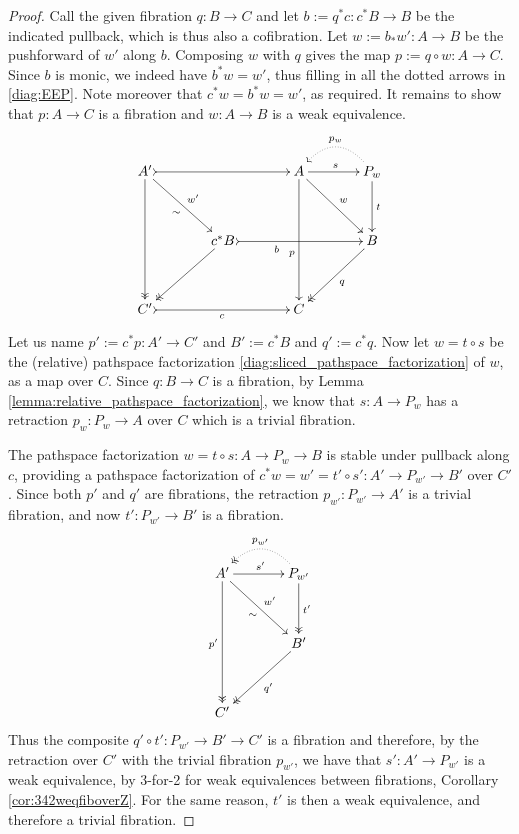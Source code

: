 \documentclass[11pt,reqno]{amsart}
\newcommand{\ra}{\ensuremath{\rightarrow}}
\theoremstyle{remark}
\theoremstyle{definition}
\begin{document}
\begin{proof}
Call the given fibration $q:B\ra C$ and let $b:=  q^*c : c^*B \ra B$ be the indicated pullback, which is thus also a cofibration. Let $w := b_*w' : A\ra B$ be the pushforward of $w'$ along $b$.  Composing $w$ with $q$ gives the map $p:= q\circ w:A\ra C$.  Since $b$ is monic, we indeed have $b^*w = w'$, thus filling in all the dotted arrows in \eqref{diag:EEP}.  Note moreover that $c^*w =  b^*w = w'$, as required. It remains to show that $p:A\ra C$ is a fibration and $w : A\ra B$ is a weak equivalence.   
\begin{equation}\label{diag:EEPfactored}
\xymatrix@=1.5em{
A' \ar@{->>}[dddd] \ar[rrdd]_{\sim}^{w'} \ar@{>->}[rrrr] && && A \ar[dddd]_>>>>>>>>>>>>p \ar[rrdd]^{w} \ar[rr]^s && \ar@{.>}@/_1.5pc/[ll]_{p_w} P_w \ar[dd]^t \\
\\
&& c^*B \ar@{->>}[lldd] \ar@{>->}[rrrr]_<<<<<<<<<<b  &&&& B \ar@{->>}[lldd]^q  \\
\\
C' \ar@{>->}[rrrr]_c &&&& C &&
}
\end{equation}
Let us name $p':= c^*p : A' \ra C'$ and $B' := c^*B$ and $q':= c^*q$.
Now let $w=t\circ s$ be the (relative) pathspace factorization \eqref{diag:sliced_pathspace_factorization} of $w$, as a map over $C$.  Since $q:B \ra C$ is a fibration, by Lemma \ref{lemma:relative_pathspace_factorization}, we know that $s : A\ra P_w$ has a retraction $p_w : P_w \ra A$ over $C$ which is a trivial fibration.  

The pathspace factorization $w=t\circ s : A \ra P_w \ra B$ is stable under pullback along $c$, providing a pathspace factorization of $c^*w = w'=t'\circ s' : A' \ra P_{w'} \ra B'$ over $C'$.  Since both $p'$ and $q'$ are fibrations, the retraction $p_{w'}: P_{w'} \ra A'$ is a trivial fibration, and now $t' : P_{w'} \ra B'$ is a fibration.
\begin{equation}\label{diag:EEPfactored2}
\xymatrix@=1.5em{
A' \ar@{->>}[dddd]_{p'} \ar[rrdd]_{\sim}^{w'}  \ar[rr]^{s'} && \ar@{.>>}@/_1.5pc/[ll]_{p_{w'}} P_{w'} 
	\ar@{->>}[dd]^{t'} \\
\\
&& B' \ar@{->>}[lldd]^{q'} \\
\\
C' &&
}
\end{equation}
Thus the composite $q'\circ t' : P_{w'} \ra B' \ra C'$ is a fibration and therefore, by the retraction over $C'$ with the trivial fibration $p_{w'}$, we have that $s' : A' \ra P_{w'}$ is a weak equivalence, by 3-for-2 for weak equivalences between fibrations, Corollary \ref{cor:342weqfiboverZ}.  For the same reason, $t'$ is then a weak equivalence, and therefore a trivial fibration.


\end{proof}
\end{document}
